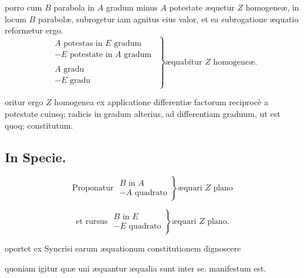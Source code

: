 \documentclass[11pt,a4paper]{article}
\begin{document}
porro cum $B$ parabola in $A$ gradum minus $A$ potestate æquetur $Z$ homogeneæ, in locum $B$ parabolæ, subrogetur iam agnitus eius valor, et ea subrogatione æquatio reformetur ergo.
\[ \left.\begin{array}{c} \begin{array}{l} A \text{ potestas in } E \text{ gradum} \\ - E \text{ potestate in } A \text{ gradum} \end{array} \\ \hline \begin{array}{l} A \text{ gradu} \\ - E \text{ gradu} \end{array} \end{array}\right\} \text{æquabitur } Z \text{ homogeneæ.} \]

oritur ergo $Z$ homogenea ex applicatione differentiæ factorum reciprocè a potestate cuiusq; radicis in gradum alterius, ad differentiam graduum, ut est quoq; constitutum.

\subsection*{In Specie.}

\[ \text{Proponatur } \left.\begin{array}{l} B \text{ in } A \\ - A \text{ quadrato} \end{array}\right\} \text{æquari } Z \text{ plano} \]

\[ \text{et rursus } \left.\begin{array}{l} B \text{ in } E \\ - E \text{ quadrato} \end{array}\right\} \text{æquari } Z \text{ plano.} \]

oportet ex Syncrisi earum æquationum constitutionem dignoscere

quoniam igitur quæ uni æquantur æqualia sunt inter se. manifestum est.

\end{document}
